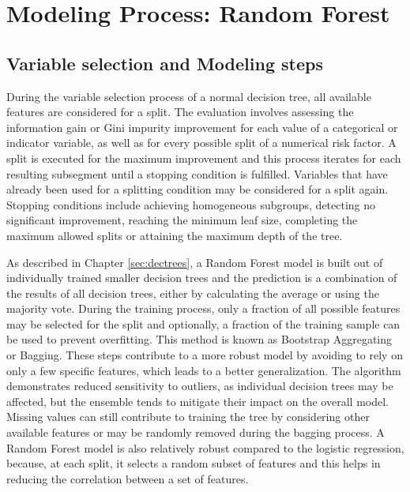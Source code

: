 \section{Modeling Process: Random Forest}

\subsection{Variable selection and Modeling steps}
\label{sec:mp_rf}
During the variable selection process of a normal decision tree, all available features are considered for a split. The evaluation involves assessing  the information gain or Gini impurity improvement for each value of a categorical or indicator variable, as well as for every possible split of a numerical risk factor. A split is executed for the maximum improvement and this process iterates for each resulting subsegment until a stopping condition is fulfilled. Variables that have already been used for a splitting condition may be considered for a split again. Stopping conditions include achieving homogeneous subgroups, detecting no significant improvement, reaching the minimum leaf size, completing the maximum allowed splits or attaining the maximum depth of the tree. \cite[pp.~2,4]{BDT}

As described in Chapter \ref{sec:dectrees}, a Random Forest model is built out of individually trained smaller decision trees and the prediction is a combination of the results of all decision trees, either by calculating the average or using the majority vote. During the training process, only a fraction of all possible features may be selected for the split and optionally, a fraction of the training sample can be used to prevent overfitting. This method is known as Bootstrap Aggregating or Bagging. These steps contribute to a more robust model by avoiding to rely on only a few specific features, which leads to a better generalization. The algorithm demonstrates reduced sensitivity to outliers, as individual decision trees may be affected, but the ensemble tends to mitigate their impact on the overall model. Missing values can still contribute to training the tree by considering other available features or may be randomly removed during the bagging process. A Random Forest model is also relatively robust compared to the logistic regression, because, at each split, it selects a random subset of features and this helps in reducing the correlation between a set of features. \cite{RanFor:2023} 

